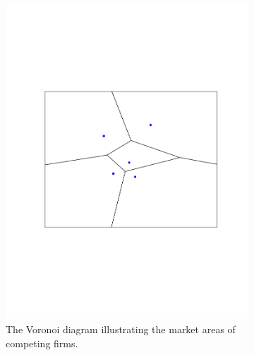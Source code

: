 \documentclass[preprint, 12pt]{elsarticle}
\begin{document}
\begin{figure}
	\caption{Example with five competing firms (blue markers) in market where $\mu=0$ and $n_l/n_r = 1$.}
	\centering
	\begin{subfigure}[t]{0.31\textwidth}
		\includegraphics[width=\textwidth, trim={34mm 76mm 28mm 76mm}]{Graphics/maxcov_a_voronoi.pdf}
		\caption{The Voronoi diagram illustrating the market areas of competing firms.}
		\label{fig:maxcov_voronoi}
	\end{subfigure}
	~
	\begin{subfigure}[t]{0.31\textwidth}

\end{subfigure}
\end{figure}
\end{document}
